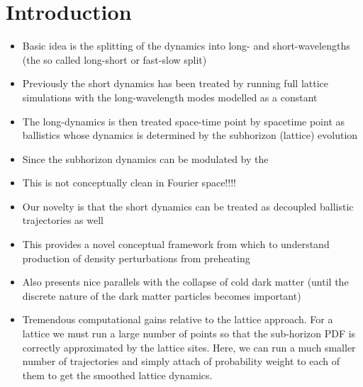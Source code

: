 \section{Introduction}
\begin{itemize}
\item Basic idea is the splitting of the dynamics into long- and short-wavelengths (the so called long-short or fast-slow split)
\item Previously the short dynamics has been treated by running full lattice simulations with the long-wavelength modes modelled as a constant
\item The long-dynamics is then treated space-time point by spacetime point as ballistics whose dynamics is determined by the subhorizon (lattice) evolution
\item Since the subhorizon dynamics can be modulated by the
\item This is not conceptually clean in Fourier space!!!!
\item Our novelty is that the short dynamics can be treated as decoupled ballistic trajectories as well
\item This provides a novel conceptual framework from which to understand production of density perturbations from preheating
\item Also presents nice parallels with the collapse of cold dark matter (until the discrete nature of the dark matter particles becomes important)
\item Tremendous computational gains relative to the lattice approach.  For a lattice we must run a large number of points so that the sub-horizon PDF is correctly approximated by the lattice sites.  Here, we can run a much smaller number of trajectories and simply attach of probability weight to each of them to get the smoothed lattice dynamics.  
\end{itemize}
